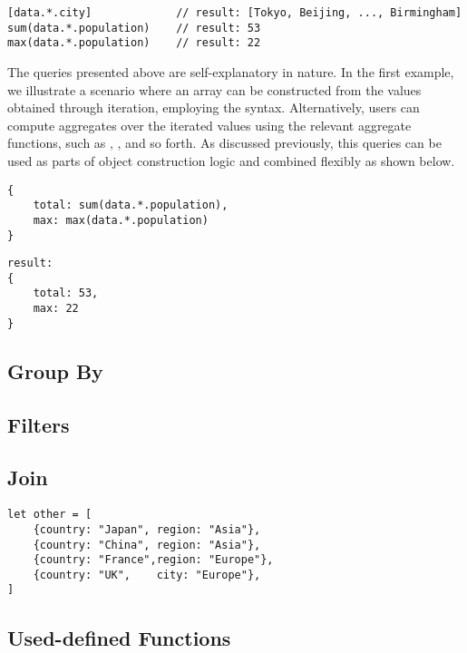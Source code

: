 \documentclass[runningheads]{llncs}
\begin{document}
\begin{lstlisting}[style=JavaScript, columns=flexible]
[data.*.city]             // result: [Tokyo, Beijing, ..., Birmingham]
sum(data.*.population)    // result: 53
max(data.*.population)    // result: 22
\end{lstlisting}

The queries presented above are self-explanatory in nature.
In the first example, we illustrate a scenario where an array can be constructed
from the values obtained through iteration, employing the \inline{[...]} syntax.
Alternatively, users can compute aggregates over the iterated values using the
relevant aggregate functions, such as , , and so forth.
As discussed previously, this queries can be used as parts of object
construction logic and combined flexibly as shown below.

\begin{minipage}{0.5\textwidth}
\begin{lstlisting}[style=JavaScript, columns=flexible, numbers=none]
{
    total: sum(data.*.population),
    max: max(data.*.population)
}
\end{lstlisting}
\end{minipage}

\begin{minipage}{0.5\textwidth}
\begin{lstlisting}[style=JSComment, columns=flexible, numbers=none]
result: 
{
    total: 53,
    max: 22
}
\end{lstlisting}
\end{minipage}


\subsection{Group By}
\subsection{Filters}
\subsection{Join}
\begin{lstlisting}[style=JavaScript]
let other = [
    {country: "Japan", region: "Asia"},
    {country: "China", region: "Asia"},
    {country: "France",region: "Europe"},
    {country: "UK",    city: "Europe"},
]
\end{lstlisting}
\subsection{Used-defined Functions}
\end{document}
